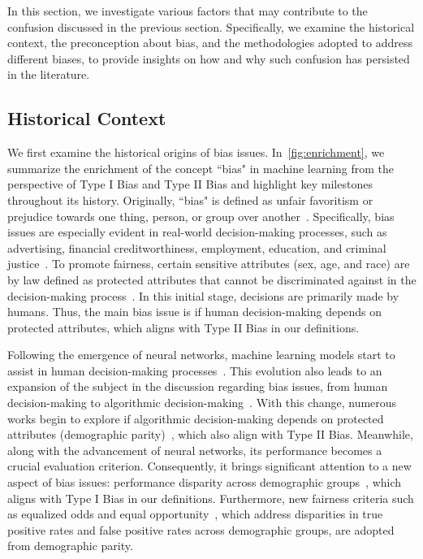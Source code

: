 \label{sec:reason}
In this section, we investigate various factors that may contribute to the confusion discussed in the previous section. 
Specifically, we examine the historical context, the preconception about bias, and the methodologies adopted to address different biases, to provide insights on how and why such confusion has persisted in the literature.





\subsection{Historical Context}
We first examine the historical origins of bias issues.
In~\cref{fig:enrichment}, we summarize the enrichment of the concept ``bias" in machine learning from the perspective of Type I Bias and Type II Bias and highlight key milestones throughout its history.
Originally, ``bias" is defined as unfair favoritism or prejudice towards one thing, person, or group over another~\cite{ditomaso2015racism}.
Specifically, bias issues are especially evident in real-world decision-making processes, such as advertising, financial creditworthiness, employment, education, and criminal justice~\cite{ruggeri2023persistence,edmond2019just}.
To promote fairness, certain sensitive attributes (\eg sex, age, and race) are by law defined as protected attributes that cannot be discriminated against in the decision-making process~\cite{protected_attributes}.
In this initial stage, decisions are primarily made by humans.
Thus, the main bias issue is if human decision-making depends on protected attributes, which aligns with Type II Bias in our definitions.







Following the emergence of neural networks, machine learning models start to assist in human decision-making processes~\cite{bastani2021improving,dankwa2019transforming}. 
This evolution also leads to an expansion of the subject in the discussion regarding bias issues, from human decision-making to algorithmic decision-making~\cite{starke2022fairness}. 
With this change, numerous works begin to explore if algorithmic decision-making depends on protected attributes (\ie demographic parity)~\cite{fairness_through_awareness, counterfactual_fairness}, which also align with Type II Bias.
Meanwhile, along with the advancement of neural networks, its performance becomes a crucial evaluation criterion.
Consequently, it brings significant attention to a new aspect of bias issues: performance disparity across demographic groups~\cite{Timnit_sex_classification_PPB,Accuracy_parity}, which aligns with Type I Bias in our definitions.
Furthermore, new fairness criteria such as equalized odds and equal opportunity~\cite{EO_define}, which address disparities in true positive rates and false positive rates across demographic groups, are adopted from demographic parity.














